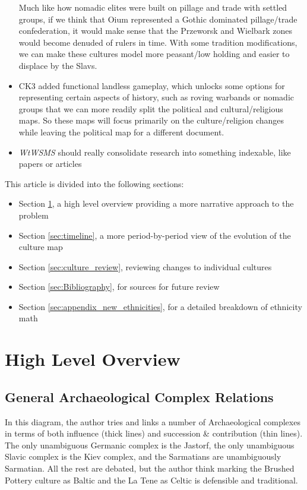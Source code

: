 \documentclass{article}
\begin{document}
\begin{itemize}
		Much like how nomadic elites were built on pillage and trade with settled groups, if we think that Oium represented a Gothic dominated pillage/trade confederation, it would make sense that the Przeworsk and Wielbark zones would become denuded of rulers in time.
		With some tradition modifications, we can make these cultures model more peasant/low holding and easier to displace by the Slavs.
		\item CK3 added functional landless gameplay, which unlocks some options for representing certain aspects of history, such as roving warbands or nomadic groups that we can more readily split the political and cultural/religious maps.
		So these maps will focus primarily on the culture/religion changes while leaving the political map for a different document.
		\item \textit{WtWSMS} should really consolidate research into something indexable, like papers or articles
	\end{itemize}
	
	This article is divided into the following sections:
	
	\begin{itemize}
		\item Section \ref{sec:high_level_overview}, a high level overview providing a more narrative approach to the problem
		\item Section \ref{sec:timeline}, a more period-by-period view of the evolution of the culture map
		\item Section \ref{sec:culture_review}, reviewing changes to individual cultures
		\item Section \ref{sec:Bibliography}, for sources for future review
		\item Section \ref{sec:appendix_new_ethnicities}, for a detailed breakdown of ethnicity math
	\end{itemize}
	
	\section{High Level Overview}
	\label{sec:high_level_overview}
	
	\subsection{General Archaeological Complex Relations}
	In this diagram, the author tries and links a number of Archaeological complexes in terms of both influence (thick lines) and succession \& contribution (thin lines).
	The only unambiguous Germanic complex is the Jastorf,  the only unambiguous Slavic complex is the Kiev complex, and the Sarmatians are unambiguously Sarmatian.
	All the rest are debated, but the author think marking the Brushed Pottery culture as Baltic and the La Tene as Celtic is defensible and traditional.
	
\end{document}
